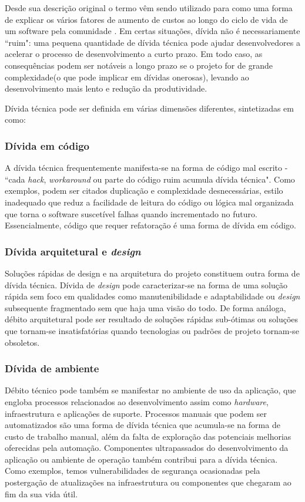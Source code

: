 Desde sua descrição original o termo vêm sendo utilizado para como uma forma de explicar os vários fatores de aumento de custos ao longo do ciclo de vida de um software pela comunidade \cite{brown2010managing}.
Em certas situações, dívida não é necessariamente ``ruim": uma pequena quantidade de dívida técnica pode ajudar desenvolvedores a acelerar o processo de desenvolvimento a curto prazo.
Em todo caso, as consequências podem ser notáveis a longo prazo se o projeto for de grande complexidade(o que pode implicar em dívidas onerosas), levando ao desenvolvimento mais lento e redução da produtividade.

Dívida técnica pode ser definida em várias dimensões diferentes, sintetizadas em \cite{tom2013exploration} como:

\subsubsection{Dívida em código}
A dívida técnica frequentemente manifesta-se na forma de código mal escrito - ``cada \textit{hack}, \textit{workaround} ou parte do código ruim acumula dívida técnica"\cite{stopford2010}. Como exemplos, podem ser citados duplicação e complexidade desnecessárias, estilo inadequado que reduz a facilidade de leitura do código ou lógica mal organizada que torna o software suscetível falhas quando incrementado no futuro. Essencialmente, código que requer refatoração é uma forma de dívida em código.

\subsubsection{Dívida arquitetural e \textit{design}}
Soluções rápidas de design e na arquitetura do projeto constituem outra forma de dívida técnica. Dívida de \textit{design} pode caracterizar-se na forma de uma solução rápida sem foco em qualidades como manutenibilidade e adaptabilidade ou \textit{design} subsequente fragmentado sem que haja uma visão do todo\cite{shriver2010}. De forma análoga, débito arquitetural pode ser resultado de soluções rápidas sub-ótimas ou soluções que tornam-se insatisfatórias quando tecnologias ou padrões de projeto tornam-se obsoletos.

\subsubsection{Dívida de ambiente}

Débito técnico pode também se manifestar no ambiente de uso da aplicação, que engloba processos relacionados ao desenvolvimento assim como \textit{hardware}, infraestrutura e aplicações de suporte. Processos manuais que podem ser automatizados são uma forma de dívida técnica que acumula-se na forma de custo de trabalho manual, além da falta de exploração das potenciais melhorias oferecidas pela automação. Componentes ultrapassados do desenvolvimento da aplicação ou ambiente de operação também contribui para a dívida técnica. Como exemplos, temos vulnerabilidades de segurança ocasionadas pela postergação de atualizações na infraestrutura ou componentes que chegaram ao fim da sua vida útil.

